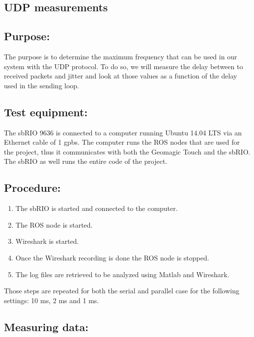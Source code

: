 \subsection{UDP measurements}\label{sec_udp_mes}

\subsection*{Purpose:}

The purpose is to determine the maximum frequency that can be used in our system with the UDP protocol. To do so, we will measure the delay between to received packets and jitter and look at those values as a function of the delay used in the sending loop.

\subsection*{Test equipment:}

The sbRIO 9636 is connected to a computer running Ubuntu 14.04 LTS via an Ethernet cable of 1 gpbs. The computer runs the ROS nodes that are used for the project, thus it communicates with both the Geomagic Touch and the sbRIO. The sbRIO as well runs the entire code of the project.

\subsection*{Procedure:}

\begin{enumerate}
	\item The sbRIO is started and connected to the computer.
	\item The ROS node is started.
	\item Wireshark is started.%
	\item Once the Wireshark recording is done the ROS node is stopped.
	\item The log files are retrieved to be analyzed using Matlab and Wireshark.
\end{enumerate}
Those steps are repeated for both the serial and parallel case for the following settings: 10 ms, 2 ms and 1 ms.


\subsection*{Measuring data:}

